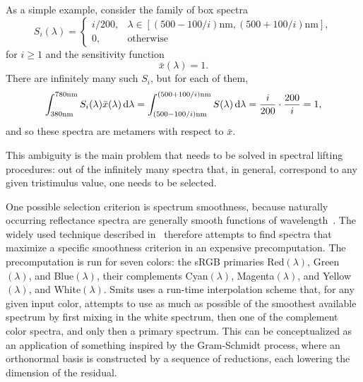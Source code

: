 As a simple example, consider the family of box spectra
\begin{equation*}
    S_i(\lambda) = \begin{cases}
        i / 200, &\lambda \in [ (500-100/i)\unit{\nano\meter}, (500+100/i)\unit{\nano\meter}],\\
        0, &\text{otherwise}
    \end{cases}
\end{equation*}
for $i \geq 1 $ and the sensitivity function
\begin{equation*}
    \bar x(\lambda) = 1.
\end{equation*}
There are infinitely many such $S_i$, but for each of them,
\begin{equation*}
    \int_{380\unit{\nano\meter}}^{780\unit{\nano\meter}} S_i(\lambda) \bar x(\lambda)\d\lambda
    = 
    \int_{(500-100/i)\unit{\nano\meter}}^{(500+100/i)\unit{\nano\meter}} S(\lambda)\d\lambda
    = \frac{i}{200} \cdot \frac{200}{i} = 1,
\end{equation*}
and so these spectra are metamers with respect to $\bar x$.

This ambiguity is the main problem that needs to be solved in spectral
lifting procedures: out of the infinitely many spectra that, in general,
correspond to any given tristimulus value, one needs to be selected.

One possible selection criterion is spectrum smoothness, because naturally occurring
reflectance spectra are generally smooth functions of wavelength~\cite{maloney86}. 
The widely used technique described in~\cite{smits99} therefore attempts to find spectra that
maximize a specific smoothness criterion in an expensive precomputation.
The precomputation is run for seven colors: the sRGB primaries 
Red$(\lambda)$, Green$(\lambda)$, and Blue$(\lambda)$, 
their complements
Cyan$(\lambda)$, Magenta$(\lambda)$, and Yellow$(\lambda)$, and White$(\lambda)$. 
Smits uses a run-time interpolation scheme
that, for any given input color, attempts to use as much as possible 
of the smoothest available spectrum by first mixing in the white spectrum, 
then one of the complement color spectra, and only then a primary spectrum.
This can be conceptualized as an application of something inspired by the 
Gram-Schmidt process, where an orthonormal basis is constructed by a sequence
of reductions, each lowering the dimension of the residual.


